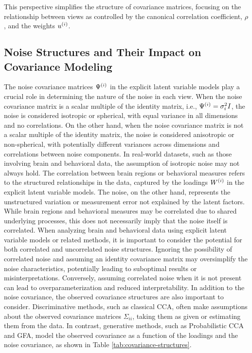 This perspective simplifies the structure of covariance matrices, focusing on the relationship between views as controlled by the canonical correlation coefficient, \(\rho\), and the weights \(u^{(i)}\).

\subsection{Noise Structures and Their Impact on Covariance Modeling}
The noise covariance matrices $\Psi^{(i)}$ in the explicit latent variable models play a crucial role in determining the nature of the noise in each view. When the noise covariance matrix is a scalar multiple of the identity matrix, i.e., $\Psi^{(i)} = \sigma_i^2 I$, the noise is considered isotropic or spherical, with equal variance in all dimensions and no correlations. On the other hand, when the noise covariance matrix is not a scalar multiple of the identity matrix, the noise is considered anisotropic or non-spherical, with potentially different variances across dimensions and correlations between noise components.
In real-world datasets, such as those involving brain and behavioral data, the assumption of isotropic noise may not always hold. The correlation between brain regions or behavioral measures refers to the structured relationships in the data, captured by the loadings $W^{(i)}$ in the explicit latent variable models. The noise, on the other hand, represents the unstructured variation or measurement error not explained by the latent factors. While brain regions and behavioral measures may be correlated due to shared underlying processes, this does not necessarily imply that the noise itself is correlated.
When analyzing brain and behavioral data using explicit latent variable models or related methods, it is important to consider the potential for both correlated and uncorrelated noise structures. Ignoring the possibility of correlated noise and assuming an identity covariance matrix may oversimplify the noise characteristics, potentially leading to suboptimal results or misinterpretations. Conversely, assuming correlated noise when it is not present can lead to overparameterization and reduced interpretability.
In addition to the noise covariance, the observed covariance structures are also important to consider. Discriminative methods, such as classical CCA, often make assumptions about the observed covariance matrices $\Sigma_{ii}$, taking them as given or estimating them from the data. In contrast, generative methods, such as Probabilistic CCA and GFA, model the observed covariance as a function of the loadings and the noise covariance, as shown in Table \ref{tab:covariance-structures}.
